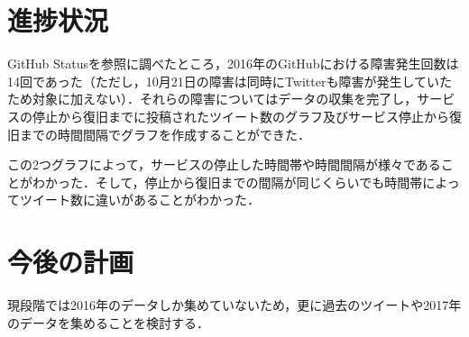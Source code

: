 \documentclass[uplatex,twocolumn,dvipdfmx]{jsarticle}
\begin{document}
\section{進捗状況}
GitHub Statusを参照に調べたところ，2016年のGitHubにおける障害発生回数は14回であった（ただし，10月21日の障害は同時にTwitterも障害が発生していたため対象に加えない）．それらの障害についてはデータの収集を完了し，サービスの停止から復旧までに投稿されたツイート数のグラフ及びサービス停止から復旧までの時間間隔でグラフを作成することができた．

この2つグラフによって，サービスの停止した時間帯や時間間隔が様々であることがわかった．そして，停止から復旧までの間隔が同じくらいでも時間帯によってツイート数に違いがあることがわかった．
\section{今後の計画}
現段階では2016年のデータしか集めていないため，更に過去のツイートや2017年のデータを集めることを検討する．

\end{document}
